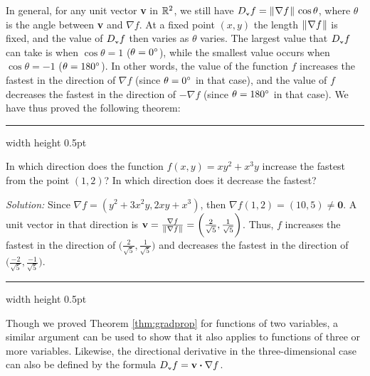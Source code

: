 In general, for any unit vector \textbf{v} in $\mathbb{R}^{2}$, we still have 
$D_{\scriptscriptstyle \textbf{v}}f = \lVert\mspace{1mu}\nabla f\mspace{1mu}\rVert\,\cos \theta$, where $\theta$ is the angle between \textbf{v} and $\nabla f$.
At a fixed point $(x,y)$ the length $\lVert\mspace{1mu}\nabla f\mspace{1mu}\rVert$ is fixed,
and the value of $D_{\scriptscriptstyle \textbf{v}}f$ then varies as $\theta$ varies. The largest value
that $D_{\scriptscriptstyle \textbf{v}}f$ can take is when $\cos \theta = 1$ ($\theta = 0^\circ$), while the smallest value occurs
when $\cos \theta = -1$ ($\theta = 180^\circ$). In other words, the value of the function $f$ increases the fastest
in the direction of $\nabla f$ (since $\theta = 0^\circ$ in that case), and the value of $f$ decreases the fastest in
the direction of $-\nabla f$ (since $\theta = 180^\circ$ in that case). We have thus proved the following theorem:


\vspace{3mm}
\hrule width \textwidth height 0.5pt
\begin{exmp}
 In which direction does the function $f(x,y) = xy^2 + x^3 y$ increase the fastest from the point $(1,2)$?
 In which direction does it decrease the fastest?\vspace{1mm}
 \par\noindent\emph{Solution:} Since $\nabla f = (y^2 + 3x^2 y, 2xy + x^3)$, then
 $\nabla f(1,2) = (10,5) \ne \textbf{0}$. A unit vector in that direction is $\textbf{v} =
 \frac{\nabla f}{\lVert\mspace{1mu}\nabla f\mspace{1mu}\rVert} = \biggl( \frac{2}{\sqrt{5}}, \frac{1}{\sqrt{5}} \biggr)$. Thus, $f$ increases the
 fastest in the direction of $\biggl( \frac{2}{\sqrt{5}}, \frac{1}{\sqrt{5}} \biggr)$ and decreases the fastest in
 the direction of $\biggl( \frac{-2}{\sqrt{5}}, \frac{-1}{\sqrt{5}} \biggr)$.
\end{exmp}
\hrule width \textwidth height 0.5pt
\vspace{3mm}

Though we proved Theorem \ref{thm:gradprop} for functions of two variables, a similar argument can be used to show
that it also applies to functions of three or more variables. Likewise, the directional derivative in the
three-dimensional case can also be defined by the formula $D_{\scriptscriptstyle \textbf{v}}f =
\textbf{v} \bm{\cdot} \nabla f$.

